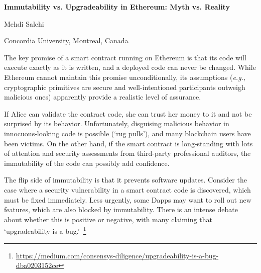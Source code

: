 \documentclass[a4paper]{article}
\newcommand{\eg}{\textit{e.g.,}\xspace}
\begin{document}

\Large
 \begin{center}
\textbf{Immutability vs. Upgradeability in Ethereum: Myth vs. Reality}\\ 

\hspace{10pt}

\large
Mehdi Salehi \\

\hspace{10pt}

\small  
 Concordia University, Montreal, Canada

\end{center}

\hspace{10pt}

\normalsize

The key promise of a smart contract running on Ethereum is that its code will execute exactly as it is written, and a deployed code can never be changed. While Ethereum cannot maintain this promise unconditionally, its assumptions (\eg cryptographic primitives are secure and well-intentioned participants outweigh malicious ones) apparently provide a realistic level of assurance. 

If Alice can validate the contract code, she can trust her money to it and not be surprised by its behavior. Unfortunately, disguising malicious behavior in innocuous-looking code is possible (`rug pulls'), and many blockchain users have been victims. On the other hand, if the smart contract is long-standing with lots of attention and security assessments from third-party professional auditors, the immutability of the code can possibly add confidence. 

The flip side of immutability is that it prevents software updates. Consider the case where a security vulnerability in a smart contract code is discovered, which must be fixed immediately. Less urgently, some Dapps may want to roll out new features, which are also blocked by immutability. There is an intense debate about whether this is positive or negative, with many claiming that `upgradeability is a bug.'~\footnote{\url{https://medium.com/consensys-diligence/upgradeability-is-a-bug-dba0203152ce}}
\end{document}
